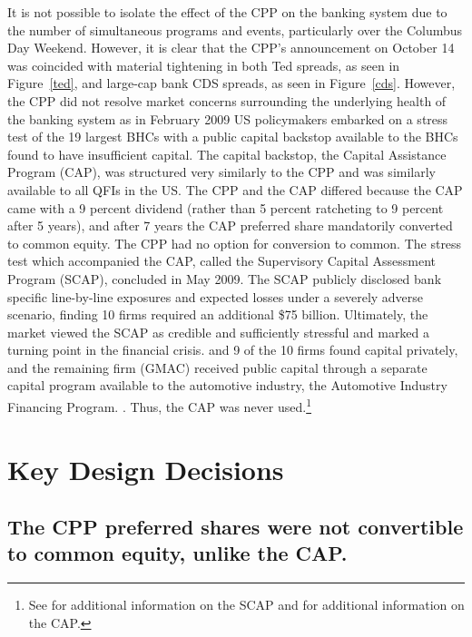 \documentclass[12pt]{article}
\begin{document}
It is not possible to isolate the effect of the CPP on the banking system due to the number of simultaneous programs and events, particularly over the Columbus Day Weekend. However, it is clear that the CPP's announcement on October 14 was coincided with material tightening in both Ted spreads, as seen in Figure~\ref{ted}, and large-cap bank CDS spreads, as seen in Figure~\ref{cds}. However, the CPP did not resolve market concerns surrounding the underlying health of the banking system as in February 2009 US policymakers embarked on a stress test of the 19 largest BHCs with a public capital backstop available to the BHCs found to have insufficient capital. The capital backstop, the Capital Assistance Program (CAP), was structured very similarly to the CPP and was similarly available to all QFIs in the US. The CPP and the CAP differed because the CAP came with a 9 percent dividend (rather than 5 percent ratcheting to 9 percent after 5 years), and after 7 years the CAP preferred share mandatorily converted to common equity. The CPP had no option for conversion to common. The stress test which accompanied the CAP, called the Supervisory Capital Assessment Program (SCAP), concluded in May 2009. The SCAP publicly disclosed bank specific line-by-line exposures and expected losses under a severely adverse scenario, finding 10 firms required an additional \$75 billion. Ultimately, the market viewed the SCAP as credible and sufficiently stressful and marked a turning point in the financial crisis. \citep{Bernanke} and \citep{Geithner} 9 of the 10 firms found capital privately, and the remaining firm (GMAC) received public capital through a separate capital program available to the automotive industry, the Automotive Industry Financing Program. \citep{OFR}. Thus, the CAP was never used.\footnote{See \citet{Ross2016a} for additional information on the SCAP and \citet{Ross2016b} for additional information on the CAP.}




















\section{Key Design Decisions}

\subsection{The CPP preferred shares were not convertible to common equity, unlike the CAP.}
\end{document}
